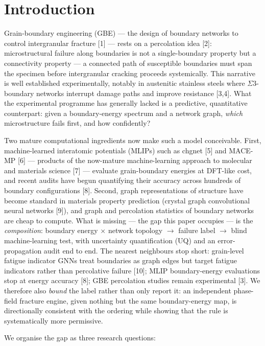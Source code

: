 \documentclass[preprint,12pt]{elsarticle}
\begin{document}
\section{Introduction}

Grain-boundary engineering (GBE) --- the design of boundary networks to control intergranular fracture [1] --- rests on a percolation idea [2]: microstructural failure along boundaries is not a single-boundary property but a connectivity property --- a connected path of susceptible boundaries must span the specimen before intergranular cracking proceeds systemically. This narrative is well established experimentally, notably in austenitic stainless steels where $\Sigma$3-boundary networks interrupt damage paths and improve resistance [3,4]. What the experimental programme has generally lacked is a predictive, quantitative counterpart: given a boundary-energy spectrum and a network graph, \textit{which} microstructure fails first, and how confidently?

Two mature computational ingredients now make such a model conceivable. First, machine-learned interatomic potentials (MLIPs) such as chgnet [5] and MACE-MP [6] --- products of the now-mature machine-learning approach to molecular and materials science [7] --- evaluate grain-boundary energies at DFT-like cost, and recent audits have begun quantifying their accuracy across hundreds of boundary configurations [8]. Second, graph representations of structure have become standard in materials property prediction (crystal graph convolutional neural networks [9]), and graph and percolation statistics of boundary networks are cheap to compute. What is missing --- the gap this paper occupies --- is the \textit{composition}: boundary energy $\times$ network topology $\rightarrow$ failure label $\rightarrow$ blind machine-learning test, with uncertainty quantification (UQ) and an error-propagation audit end to end. The nearest neighbours stop short: grain-level fatigue indicator GNNs treat boundaries as graph edges but target fatigue indicators rather than percolative failure [10]; MLIP boundary-energy evaluations stop at energy accuracy [8]; GBE percolation studies remain experimental [3]. We therefore also \textit{bound} the label rather than only report it: an independent phase-field fracture engine, given nothing but the same boundary-energy map, is directionally consistent with the ordering while showing that the rule is systematically more permissive.

We organise the gap as three research questions:
\end{document}
